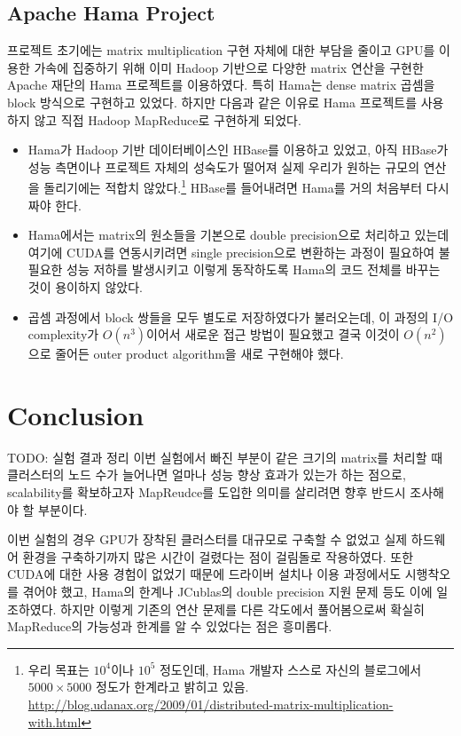 \documentclass[a4paper]{article}
\begin{document}
\begin{multicols}{2}
\subsection{Apache Hama Project}
프로젝트 초기에는 matrix multiplication 구현 자체에 대한 부담을 줄이고 GPU를 이용한 가속에 집중하기 위해 이미 Hadoop 기반으로 다양한 matrix 연산을 구현한 Apache 재단의 Hama 프로젝트를 이용하였다.
특히 Hama는 dense matrix 곱셈을 block 방식으로 구현하고 있었다.
하지만 다음과 같은 이유로 Hama 프로젝트를 사용하지 않고 직접 Hadoop MapReduce로 구현하게 되었다.
\begin{itemize}
	\item Hama가 Hadoop 기반 데이터베이스인 HBase를 이용하고 있었고, 아직 HBase가 성능 측면이나 프로젝트 자체의 성숙도가 떨어져 실제 우리가 원하는 규모의 연산을 돌리기에는 적합치 않았다.\footnote{우리 목표는 $10^4$이나 $10^5$ 정도인데, Hama 개발자 스스로 자신의 블로그에서 $5000 \times 5000$ 정도가 한계라고 밝히고 있음.\\\url{http://blog.udanax.org/2009/01/distributed-matrix-multiplication-with.html}}
	HBase를 들어내려면 Hama를 거의 처음부터 다시 짜야 한다.
	\item Hama에서는 matrix의 원소들을 기본으로 double precision으로 처리하고 있는데 여기에 CUDA를 연동시키려면 single precision으로 변환하는 과정이 필요하여 불필요한 성능 저하를 발생시키고 이렇게 동작하도록 Hama의 코드 전체를 바꾸는 것이 용이하지 않았다.
	\item 곱셈 과정에서 block 쌍들을 모두 별도로 저장하였다가 불러오는데, 이 과정의 I/O complexity가 $O(n^3)$이어서 새로운 접근 방법이 필요했고 결국 이것이 $O(n^2)$으로 줄어든 outer product algorithm을 새로 구현해야 했다.
\end{itemize}

\section{Conclusion}
{\color{BurntOrange} TODO: 실험 결과 정리}
이번 실험에서 빠진 부분이 같은 크기의 matrix를 처리할 때 클러스터의 노드 수가 늘어나면 얼마나 성능 향상 효과가 있는가 하는 점으로, scalability를 확보하고자 MapReudce를 도입한 의미를 살리려면 향후 반드시 조사해야 할 부분이다.

이번 실험의 경우 GPU가 장착된 클러스터를 대규모로 구축할 수 없었고 실제 하드웨어 환경을 구축하기까지 많은 시간이 걸렸다는 점이 걸림돌로 작용하였다.
또한 CUDA에 대한 사용 경험이 없었기 때문에 드라이버 설치나 이용 과정에서도 시행착오를 겪어야 했고, Hama의 한계나 JCublas의 double precision 지원 문제 등도 이에 일조하였다.
하지만 이렇게 기존의 연산 문제를 다른 각도에서 풀어봄으로써 확실히 MapReduce의 가능성과 한계를 알 수 있었다는 점은 흥미롭다.


\end{multicols}
\end{document}
